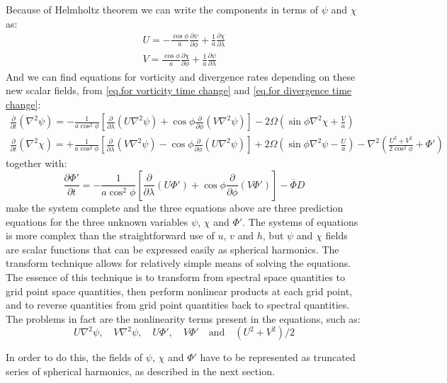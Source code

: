 Because of Helmholtz theorem we can write the components in terms of $\psi$ and $\chi$ as:
\begin{align}\label{eq.components helmholtz}
	U=-\frac{\cos\phi}{a}\frac{\partial\psi}{\partial\phi}+\frac{1}{a}\frac{\partial\chi}{\partial\lambda} \\
	V=\frac{\cos\phi}{a}\frac{\partial\chi}{\partial\phi}+\frac{1}{a}\frac{\partial\psi}{\partial\lambda}
\end{align}
And we can find equations for vorticity and divergence rates depending on these new scalar fields, from \ref{eq.for vorticity time change} and \ref{eq.for divergence time change}:
\begin{align}\label{eq.motionforstreamf}
	\frac{\partial}{\partial t}(\nabla^2\psi)=-\frac{1}{a\cos^2\phi}\left[\frac{\partial}{\partial\lambda}(U\nabla^2\psi)+\cos\phi\frac{\partial}{\partial\phi}(V\nabla^2\psi)\right]-2\Omega\left(\sin\phi\nabla^2\chi+\frac{V}{a}\right) \\
	\frac{\partial}{\partial t}(\nabla^2\chi)=+\frac{1}{a\cos^2\phi}\left[\frac{\partial}{\partial\lambda}(V\nabla^2\psi)-\cos\phi\frac{\partial}{\partial\phi}(U\nabla^2\psi)\right]+2\Omega\left(\sin\phi\nabla^2\psi-\frac{U}{a}\right)-\nabla^2\left(\frac{U^2+V^2}{2\cos^2\phi}+\Phi'\right)
\end{align}
together with:
\begin{equation}\label{eq.geostream}
	\frac{\partial\Phi'}{\partial t}=-\frac{1}{a\cos^2\phi}\left[\frac{\partial}{\partial\lambda}(U\Phi')+\cos\phi\frac{\partial}{\partial\phi}(V\Phi')\right]-\overline{\Phi}D
\end{equation}
make the system complete and the three equations above are three prediction equations for the three unknown variables $\psi$, $\chi$ and $\Phi'$. The systems of equations is more complex than the straightforward use of $u$, $v$ and $h$, but $\psi$ and $\chi$ fields are scalar functions that can be expressed easily as spherical harmonics.
The transform technique allows for relatively simple means of solving the equations. The essence of this technique is to transform from spectral space quantities to grid point space quantities, then perform nonlinear products at each grid point, and to reverse quantities from grid point quantities back to spectral quantities. The problems in fact are the nonlinearity terms present in the equations, such as:
$$U\nabla^2\psi,\quad V\nabla^2\psi,\quad U\Phi',\quad V\Phi'\quad \text{and}\quad (U^2+V^2)/2$$

In order to do this, the fields of $\psi$, $\chi$ and $\Phi'$ have to be represented as truncated series of spherical harmonics, as described in the next section.




